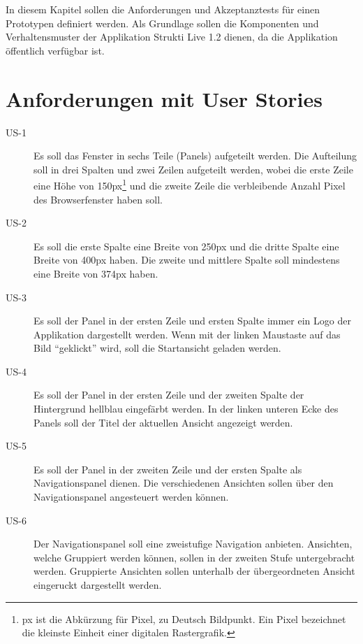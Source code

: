 In diesem Kapitel sollen die Anforderungen und Akzeptanztests für einen
Prototypen definiert werden. Als Grundlage sollen die Komponenten und
Verhaltensmuster der Applikation Strukti Live 1.2 dienen, da die Applikation
öffentlich verfügbar ist.

\section{Anforderungen mit User Stories}

\begin{description}
\item[US-1\label{itm:US-1}]
Es soll das Fenster in sechs Teile (Panels) aufgeteilt werden. Die Aufteilung
soll in drei Spalten und zwei Zeilen aufgeteilt werden, wobei die erste Zeile
eine Höhe von 150px\footnote{px ist die Abkürzung für Pixel, zu Deutsch
Bildpunkt. Ein Pixel bezeichnet die kleinste Einheit einer digitalen
Rastergrafik.} und die zweite Zeile die verbleibende Anzahl Pixel des
Browserfenster haben soll.

\item[US-2\label{itm:US-2}]
Es soll die erste Spalte eine Breite von 250px und die dritte Spalte eine Breite
von 400px haben. Die zweite und mittlere Spalte soll mindestens eine Breite von
374px haben.

\item[US-3\label{itm:US-3}]
Es soll der Panel in der ersten Zeile und ersten Spalte immer ein Logo der
Applikation dargestellt werden. Wenn mit der linken Maustaste auf das Bild ``geklickt''
wird, soll die Startansicht geladen werden.

\item[US-4\label{itm:US-4}]
Es soll der Panel in der ersten Zeile und der zweiten Spalte der Hintergrund
hellblau eingefärbt werden. In der linken unteren Ecke des Panels soll der Titel
der aktuellen Ansicht angezeigt werden.

\item[US-5\label{itm:US-5}]
Es soll der Panel in der zweiten Zeile und der ersten Spalte als
Navigationspanel dienen. Die verschiedenen Ansichten sollen über den
Navigationspanel angesteuert werden können.

\item[US-6\label{itm:US-6}]
Der Navigationspanel soll eine zweistufige Navigation anbieten. Ansichten,
welche Gruppiert werden können, sollen in der zweiten Stufe untergebracht
werden. Gruppierte Ansichten sollen unterhalb der übergeordneten Ansicht
eingeruckt dargestellt werden.


\end{description}
